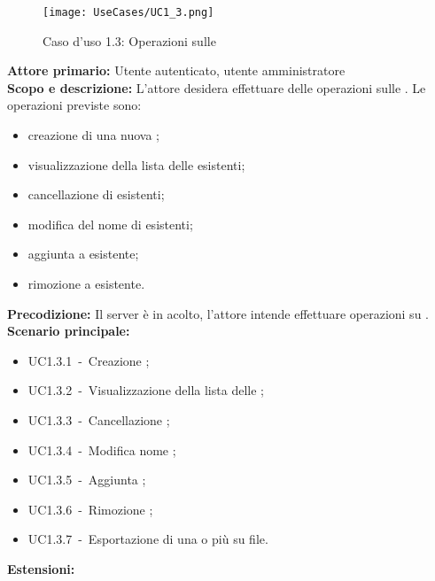 \documentclass{scalatekids-article}
\begin{document}
\begin{figure}[H]
  \begin{center}
    \texttt{[image: UseCases/UC1\_3.png]}
    \caption*{Caso d'uso 1.3: Operazioni sulle }
  \end{center}
\end{figure}
\textbf{Attore primario:} Utente autenticato, utente amministratore\\
\textbf{Scopo e descrizione:} L'attore desidera effettuare delle operazioni sulle . Le operazioni previste sono:
\begin{itemize}
\item creazione di una nuova ;
\item visualizzazione della lista delle  esistenti;
\item cancellazione di  esistenti;
\item modifica del nome di  esistenti;
\item aggiunta  a  esistente;
\item rimozione  a  esistente.
\end{itemize}
\textbf{Precodizione:} Il server è in acolto, l'attore intende effettuare operazioni su .\\
\textbf{Scenario principale:}
\begin{itemize}
\item UC1.3.1\ -\ Creazione ;
\item UC1.3.2\ -\ Visualizzazione della lista delle ;
\item UC1.3.3\ -\ Cancellazione ;
\item UC1.3.4\ -\ Modifica nome ;
\item UC1.3.5\ -\ Aggiunta ;
\item UC1.3.6\ -\ Rimozione ;
\item UC1.3.7\ -\ Esportazione di una o più  su file.
\end{itemize}
\textbf{Estensioni:}
\end{document}
